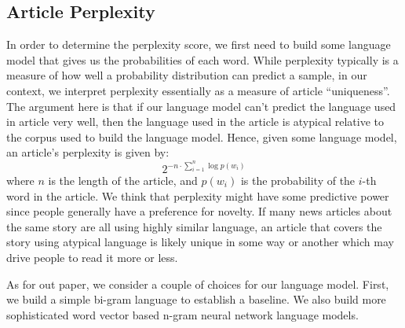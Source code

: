 \documentclass[fleqn,12pt]{SelfArx} %
\begin{document}
\subsection{Article Perplexity}
In order to determine the perplexity score, we first need to build some language model that gives us the probabilities of each word. While perplexity typically is a measure of how well a probability distribution can predict a sample, in our context, we interpret perplexity essentially as a measure of article “uniqueness”. The argument here is that if our language model can’t predict the language used in article very well, then the language used in the article is atypical relative to the corpus used to build the language model. Hence, given some language model, an article's perplexity is given by:
\begin{equation}
	2^{-n\cdot\sum_{i=1}^n \log p(w_i)}
\end{equation}
where $n$ is the length of the article, and $p(w_i)$ is the probability of the $i$-th word in the article. We think that perplexity might have some predictive power since people generally have a preference for novelty. If many news articles about the same story are all using highly similar language, an article that covers the story using atypical language is likely unique in some way or another which may drive people to read it more or less.

As for out paper, we consider a couple of choices for our language model. First, we build a simple bi-gram language to establish a baseline. We also build more sophisticated word vector based n-gram neural network language models.
\end{document}
